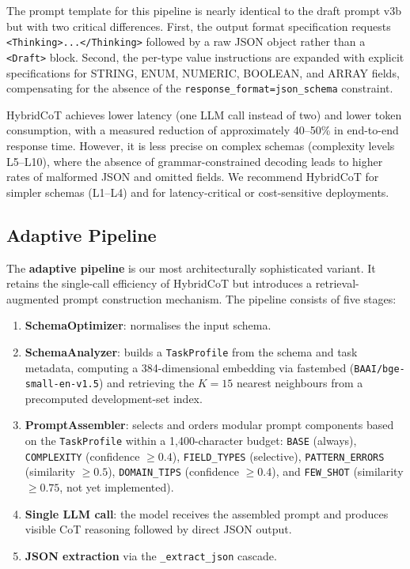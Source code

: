 \documentclass[onecolumn]{ceurart}
\begin{document}
The prompt template for this pipeline is nearly identical to the draft prompt
v3b but with two critical differences. First, the output format specification
requests \texttt{<Thinking>...</Thinking>} followed by a raw JSON object rather
than a \texttt{<Draft>} block. Second, the per-type value instructions are
expanded with explicit specifications for STRING, ENUM, NUMERIC, BOOLEAN, and
ARRAY fields, compensating for the absence of the
\texttt{response\_format=json\_schema} constraint.

HybridCoT achieves lower latency (one LLM call instead of two) and lower token
consumption, with a measured reduction of approximately 40--50\% in end-to-end
response time. However, it is less precise on complex schemas (complexity levels
L5--L10), where the absence of grammar-constrained decoding leads to higher
rates of malformed JSON and omitted fields. We recommend HybridCoT for simpler
schemas (L1--L4) and for latency-critical or cost-sensitive deployments.

\subsection{Adaptive Pipeline}

The \textbf{adaptive pipeline} is our most architecturally sophisticated
variant. It retains the single-call efficiency of HybridCoT but introduces a
retrieval-augmented prompt construction mechanism. The pipeline consists of
five stages:

\begin{enumerate}
  \item \textbf{SchemaOptimizer}: normalises the input schema.
  \item \textbf{SchemaAnalyzer}: builds a \texttt{TaskProfile} from the schema
  and task metadata, computing a 384-dimensional embedding via fastembed
  (\texttt{BAAI/bge-small-en-v1.5}) and retrieving the $K=15$ nearest
  neighbours from a precomputed development-set index.
  \item \textbf{PromptAssembler}: selects and orders modular prompt components
  based on the \texttt{TaskProfile} within a 1,400-character budget:
  \texttt{BASE} (always), \texttt{COMPLEXITY} (confidence $\geq 0.4$),
  \texttt{FIELD\_TYPES} (selective), \texttt{PATTERN\_ERRORS} (similarity
  $\geq 0.5$), \texttt{DOMAIN\_TIPS} (confidence $\geq 0.4$), and
  \texttt{FEW\_SHOT} (similarity $\geq 0.75$, not yet implemented).
  \item \textbf{Single LLM call}: the model receives the assembled prompt and
  produces visible CoT reasoning followed by direct JSON output.
  \item \textbf{JSON extraction} via the \texttt{\_extract\_json} cascade.
\end{enumerate}
\end{document}
